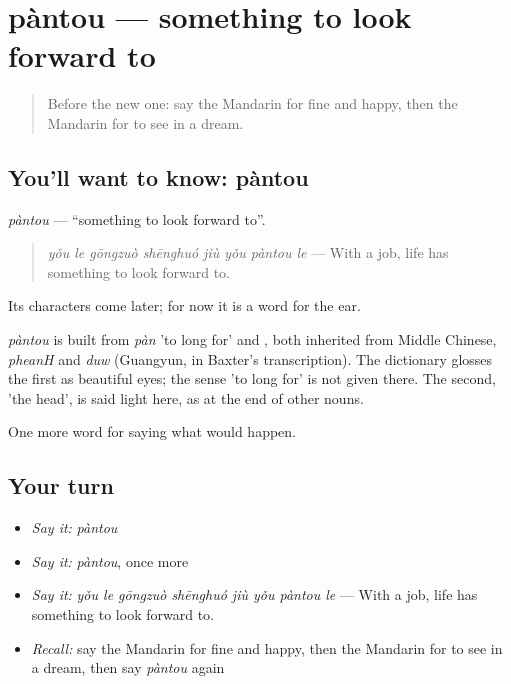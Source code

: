 \section[pàntou]{pàntou — something to look forward to}

\label{lesson:ZH-C536-pantou}



\begin{quote}
Before the new one: say the Mandarin for fine and happy, then the Mandarin for to see in a dream.
\end{quote}

\subsection*{You'll want to know: pàntou}
\emph{pàntou} — \textquotedblleft{}something to look forward to\textquotedblright{}.

\begin{quote}
\emph{yǒu le gōngzuò shēnghuó jiù yǒu pàntou le} — With a job, life has something to look forward to.
\end{quote}

Its characters come later; for now it is a word for the ear.

\begin{cousinweb}
\emph{pàntou} is built from \emph{pàn} 'to long for' and , both inherited from Middle Chinese, \emph{pheanH} and \emph{duw} (Guangyun, in Baxter's transcription). The dictionary glosses the first as beautiful eyes; the sense 'to long for' is not given there. The second, 'the head', is said light here, as at the end of other nouns.
\end{cousinweb}

\begin{grammarlens}[title={What you've built}]
One more word for saying what would happen.
\end{grammarlens}

\subsection*{Your turn}
\begin{itemize}
\raggedright
  \item \emph{Say it:} \emph{pàntou}
  \item \emph{Say it:} \emph{pàntou}, once more
  \item \emph{Say it:} \emph{yǒu le gōngzuò shēnghuó jiù yǒu pàntou le} — With a job, life has something to look forward to.
  \item \emph{Recall:} say the Mandarin for fine and happy, then the Mandarin for to see in a dream, then say \emph{pàntou} again
\end{itemize}

